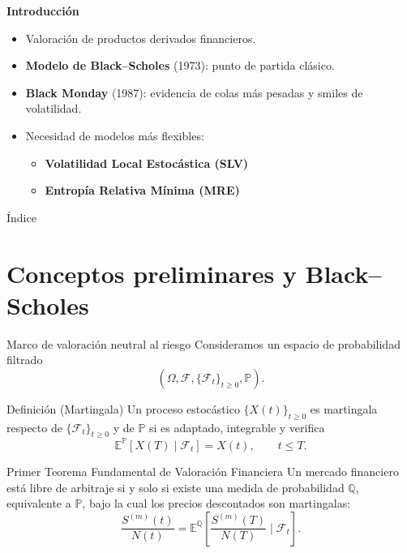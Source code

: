 \documentclass[8pt]{beamer}
\begin{document}
\begin{Large}
\begin{frame}{\bf {\LARGE {Introducción}}}
\begin{itemize}
    \item Valoración de productos derivados financieros.
    \pause
    \item {\bf Modelo de Black--Scholes} (1973): punto de partida clásico.
    \pause
    \item {\bf Black Monday} (1987): evidencia de colas más pesadas y smiles de volatilidad.
    \pause
    \item Necesidad de modelos más flexibles:
    \vspace{0.2cm}
    \begin{itemize}
        \item {\large \bf Volatilidad Local Estocástica (SLV)}
        \item {\large \bf Entropía Relativa Mínima (MRE)}
    \end{itemize}
\end{itemize}
\end{frame}
\end{Large}

\begin{frame}{Índice}
    \begin{Large}
\tableofcontents
\end{Large}
\end{frame}

\section{Conceptos preliminares y Black--Scholes}

\begin{frame}{Marco de valoración neutral al riesgo}
    Consideramos un espacio de probabilidad filtrado
    \[
    (\Omega , \mathcal{F},\{\mathcal{F}_t\}_{t\geq 0}, \mathbb{P}).
    \]
    \pause
    \begin{block}{Definición (Martingala)}
    Un proceso estocástico $\{X(t)\}_{t \geq 0}$ es martingala respecto de $\{\mathcal F_t\}_{t\geq 0}$ y de $\mathbb P$ si es adaptado, integrable y verifica
    \[
        \mathbb{E}^{\mathbb{P}}[X(T) \mid \mathcal{F}_t] = X(t), \qquad t \leq T. 
    \]
    \end{block}
    \pause

    \begin{block}{Primer Teorema Fundamental de Valoración Financiera}
Un mercado financiero está libre de arbitraje si y solo si existe una medida de probabilidad $\mathbb Q$, equivalente a $\mathbb P$, bajo la cual los precios descontados son martingalas:
    \[
        \frac{S^{(m)}(t)}{N(t)} = \mathbb{E}^{\mathbb Q}\left[ \frac{S^{(m)}(T)}{N(T)} \mid \mathcal{F}_t \right].
    \]
\end{block}
\end{frame}
\end{document}
